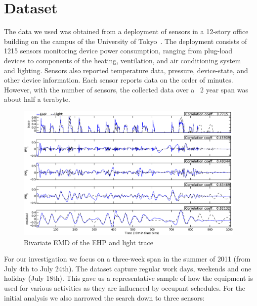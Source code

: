 \section{Dataset}
The data we used was obtained from a deployment of sensors in a 12-story office building
on the campus of the University of Tokyo~\cite{gutp, ogawa:lncs2011}.  The deployment consists of 
1215 sensors monitoring device power consumption, ranging from plug-load devices to components of the
heating, ventilation, and air conditioning system and lighting.  Sensors also reported temperature
data, pressure, device-state, and other device information.  Each sensor reports data on the
order of minutes.  However, with the number of sensors, the collected data over a ~2 year
span was about half a terabyte.


\begin{figure}[tb]
\hspace{-2cm}
\includegraphics[width=1.2\textwidth]{img/emd_25_26.eps}
\vspace{-1cm}
\caption{Bivariate EMD of the EHP and light trace}
\label{fig:emd}
\end{figure}



For our investigation we focus on a three-week span in the summer of 2011 (from July 4th to July 24th).
The dataset capture regular work days, weekends and one holiday (July 18th).  This gave us a representative sample
of how the equipment is used for various activities as they are influenced by occupant schedules.  For the initial
analysis we also narrowed the search down to three sensors:


